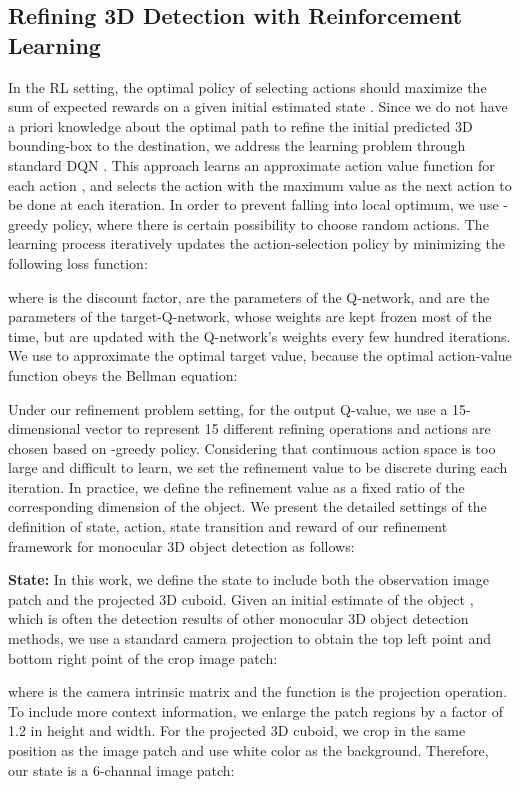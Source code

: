 \documentclass[runningheads]{llncs}
\begin{document}
\subsection{Refining 3D Detection with Reinforcement Learning}

In the RL setting, the optimal policy of selecting actions should maximize the sum of expected rewards  on a given initial estimated state . Since we do not have a priori knowledge about the optimal path to refine the initial predicted 3D bounding-box to the destination, we address the learning problem through standard DQN \cite{mnih2015human}. This approach learns an approximate action value function  for each action , and selects the action with the maximum value as the next action to be done at each iteration. In order to prevent falling into local optimum, we use -greedy policy, where there is certain possibility to choose random actions. The learning process iteratively updates the action-selection policy by minimizing the following loss function:

where  is the discount factor,  are the parameters of the Q-network, and  are the parameters of the target-Q-network, whose weights are kept frozen most of the time, but are updated with the Q-network's weights every few hundred iterations. We use  to approximate the optimal target value, because the optimal action-value function obeys the Bellman equation:


Under our refinement problem setting, for the output Q-value, we use a 15-dimensional vector to represent 15 different refining operations and actions are chosen based on -greedy policy. Considering that continuous action space is too large and difficult to learn, we set the refinement value to be discrete during each iteration. In practice, we define the refinement value as a fixed ratio of the corresponding dimension of the object. We present the detailed settings of the definition of state, action, state transition and reward of our refinement framework for monocular 3D object detection as follows:

\noindent
\textbf{State:} In this work, we define the state to include both the observation image patch and the projected 3D cuboid. Given an initial estimate of the object , which is often the detection results of other monocular 3D object detection methods, we use a standard camera projection  to obtain the top left point and bottom right point of the crop image patch:

where  is the camera intrinsic matrix and the function  is the projection operation.
To include more context information, we enlarge the patch regions by a factor of 1.2 in height and width. For the projected 3D cuboid, we crop in the same position as the image patch and use white color as the background. Therefore, our state is a 6-channal image patch:
\end{document}
